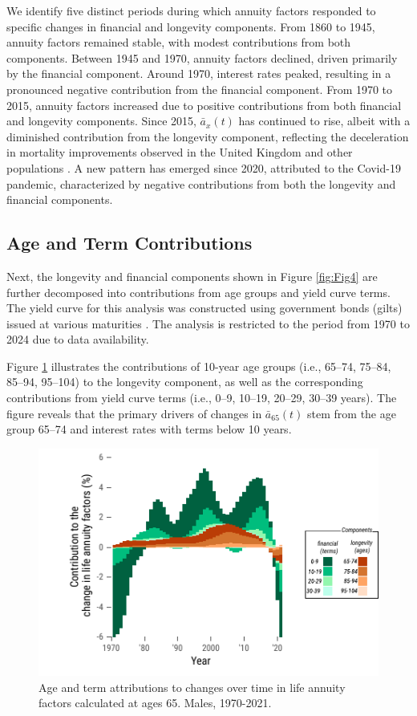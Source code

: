 \documentclass[12pt]{article}
\begin{document}
{We identify five distinct periods during which annuity factors responded to specific changes in financial and longevity components. From 1860 to 1945, annuity factors remained stable, with modest contributions from both components. Between 1945 and 1970, annuity factors declined, driven primarily by the financial component. Around 1970, interest rates peaked, resulting in a pronounced negative contribution from the financial component. From 1970 to 2015, annuity factors increased due to positive contributions from both financial and longevity components. Since 2015, \( \bar{a}_x(t) \) has continued to rise, albeit with a diminished contribution from the longevity component, reflecting the deceleration in mortality improvements observed in the United Kingdom and other populations \citep{djeundje2022slowdown}. A new pattern has emerged since 2020, attributed to the Covid-19 pandemic, characterized by negative contributions from both the longevity and financial components.


\subsection{Age and Term Contributions}

Next, the longevity and financial components shown in Figure \ref{fig:Fig4} are further decomposed into contributions from age groups and yield curve terms. The yield curve for this analysis was constructed using government bonds (gilts) issued at various maturities \citep{BankOfEngland2024}. The analysis is restricted to the period from 1970 to 2024 due to data availability.

Figure \ref{fig:Fig5} illustrates the contributions of 10-year age groups (i.e., 65–74, 75–84, 85–94, 95–104) to the longevity component, as well as the corresponding contributions from yield curve terms (i.e., 0–9, 10–19, 20–29, 30–39 years). The figure reveals that the primary drivers of changes in \( \bar{a}_{65}(t) \) stem from the age group 65–74 and interest rates with terms below 10 years.

\begin{figure}[H]
	\centering
	\includegraphics[width=0.6\linewidth]{Fig/ageTermStructureDescomposition}
	\caption{{Age and term attributions to changes over time in life annuity factors calculated at ages 65. Males, 1970-2021.}}
	\label{fig:Fig5}
\end{figure}

}
\end{document}
